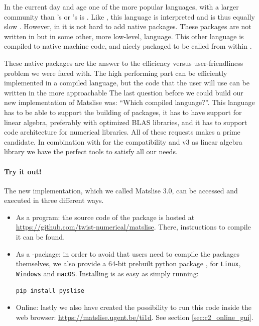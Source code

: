 In the current day and age one of the more popular languages, with a larger community than \fortran{}'s or \matlab{}'s is \lpython{}. Like \matlab{}, this language is interpreted and is thus equally slow \cite{chaves_octave_2006,unpingco_comparative_2008}. However, in \lpython{} it is not hard to add native packages. These packages are not written in \lpython{} but in some other, more low-level, language. This other language is compiled to native machine code, and nicely packaged to be called from within \lpython{}.

These native packages are the answer to the efficiency versus user-friendliness problem we were faced with. The high performing part can be efficiently implemented in a compiled language, but the code that the user will use can be written in the more approachable \lpython{} The last question before we could build our new implementation of Matslise was: ``Which compiled language?''. This language has to be able to support the building of \lpython{} packages, it has to have support for linear algebra, preferably with optimized BLAS libraries, and it has to support code architecture for numerical libraries. All of these requests makes \cpp{} a prime candidate. In combination with \pybind{} \cite{jakob_pybind11_2017} for the \lpython{} compatibility and \Eigen{} v3 \cite{guennebaud_eigen_2010} as linear algebra library we have the perfect tools to satisfy all our needs.

\paragraph{Try it out!} The new implementation, which we called Matslise 3.0, can be accessed and executed in three different ways.

\begin{itemize}
    \item As a \cpp{} program: the source code of the package is hosted at \url{https://github.com/twist-numerical/matslise}. There, instructions to compile it can be found.
    \item As a \lpython{}-package: in order to avoid that users need to compile the packages themselves, we also provide a 64-bit prebuilt python package \pyslise{}, for \texttt{Linux}, \texttt{Windows} and \texttt{macOS}. Installing \pyslise{} is as easy as simply running:
\begin{verbatim}
pip install pyslise
\end{verbatim}
    \item Online: lastly we also have created the possibility to run this code inside the web browser: \url{https://matslise.ugent.be/ti1d}. See section \ref{sec:c2_online_gui}.
\end{itemize}

